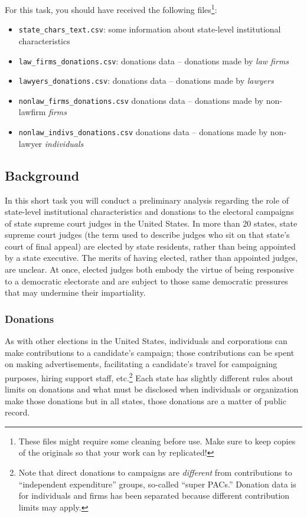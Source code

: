 \documentclass[11pt, letterpaper, twoside]{article}
\begin{document}
For this task, you should have received the following files\footnote{These files might require some cleaning before use. Make sure to keep copies of the originals so that your work can by replicated!}:
\begin{itemize}
    \item \verb|state_chars_text.csv|: some information about state-level institutional characteristics
    \item \verb|law_firms_donations.csv|: donations data -- donations made by \textit{law firms}
    \item \verb|lawyers_donations.csv|: donations data -- donations made by \textit{lawyers}
    \item \verb|nonlaw_firms_donations.csv| donations data -- donations made by non-lawfirm \textit{firms}
    \item \verb|nonlaw_indivs_donations.csv| donations data -- donations made by non-lawyer \textit{individuals} 
\end{itemize}

\subsection*{Background}
In this short task you will conduct a preliminary analysis regarding the role of state-level institutional characteristics and donations to the electoral campaigns of state supreme court judges in the United States. In more than 20 states, state supreme court judges (the term used to describe judges who sit on that state's court of final appeal) are elected by state residents, rather than being appointed by a state executive. The merits of having elected, rather than appointed judges, are unclear. At once, elected judges both embody the virtue of being responsive to a democratic electorate and are subject to those same democratic pressures that may undermine their impartiality. 

\subsubsection*{Donations}
As with other elections in the United States, individuals and corporations can make contributions to a candidate's campaign; those contributions can be spent on making advertisements, facilitating a candidate's travel for campaigning purposes, hiring support staff, etc.\footnote{Note that direct donations to campaigns are \textit{different} from contributions to ``independent expenditure'' groups, so-called ``super PACs.'' Donation data is for individuals and firms has been separated because different contribution limits may apply.} Each state has slightly different rules about limits on donations and what must be disclosed when individuals or organization make those donations but in all states, those donations are a matter of public record.
\end{document}
